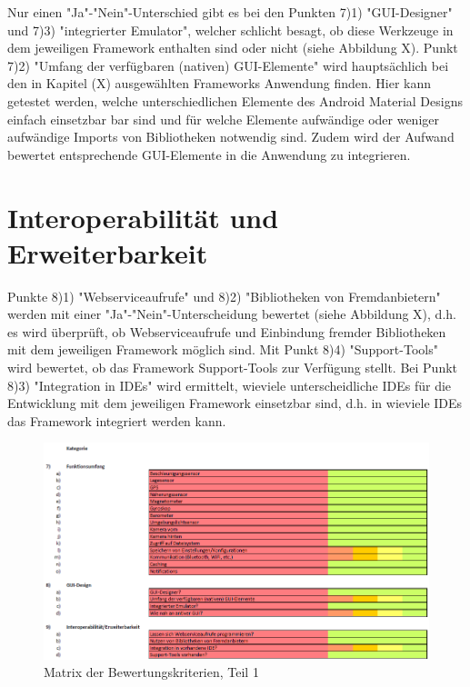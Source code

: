 Nur einen "Ja"-"Nein"-Unterschied gibt es bei den Punkten 7)1) "GUI-Designer" und 7)3) "integrierter Emulator", welcher schlicht besagt, ob diese Werkzeuge in dem jeweiligen Framework enthalten sind oder nicht (siehe Abbildung X). Punkt 7)2) "Umfang der verfügbaren (nativen) GUI-Elemente" wird hauptsächlich bei den in Kapitel (X) ausgewählten Frameworks Anwendung finden. Hier kann getestet werden, welche unterschiedlichen Elemente des Android Material Designs einfach einsetzbar bar sind und für welche Elemente aufwändige oder weniger aufwändige Imports von Bibliotheken notwendig sind. Zudem wird der Aufwand bewertet entsprechende GUI-Elemente in die Anwendung zu integrieren. 

\section{Interoperabilität und Erweiterbarkeit}

Punkte 8)1) "Webserviceaufrufe" und 8)2) "Bibliotheken von Fremdanbietern" werden mit einer "Ja"-"Nein"-Unterscheidung bewertet (siehe Abbildung X), d.h. es wird überprüft, ob Webserviceaufrufe und Einbindung fremder Bibliotheken mit dem jeweiligen Framework möglich sind. Mit Punkt 8)4) "Support-Tools" wird bewertet, ob das Framework Support-Tools zur Verfügung stellt. Bei Punkt 8)3) "Integration in IDEs" wird ermittelt, wieviele unterscheidliche IDEs für die Entwicklung mit dem jeweiligen Framework einsetzbar sind, d.h. in wieviele IDEs das Framework integriert werden kann. 

\begin{figure}[h]
	\centering
	\includegraphics[width=1\textwidth]{Bilder/Bewertungsmatrix_2.PNG}
	\caption{Matrix der Bewertungskriterien, Teil 1}
	\label{fig:Bewertungskriterien_1}
\end{figure}
\clearpage
